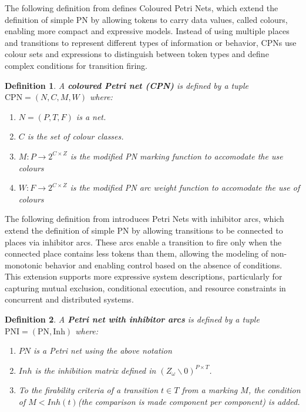 \documentclass[12pt]{article}
\newtheorem{definition}{Definition}
\begin{document}
    The following definition from \cite{girault2013petri} defines Coloured Petri Nets, which extend the definition of simple PN by allowing tokens to carry data values, called colours, enabling more compact and expressive models. Instead of using multiple places and transitions to represent different types of information or behavior, CPNs use colour sets and expressions to distinguish between token types and define complex conditions for transition firing. 
    \begin{definition}
        A \textbf{coloured Petri net (CPN)} is defined by a tuple \(\mathrm{CPN}=(N,C,M,W)\) where: 
        \begin{enumerate}
            \item $N=(P,T,F)$ is a net.
            \item \(C\) is the set of colour classes.
            \item \(M: P \rightarrow 2^{C \times Z}\) is the modified PN marking function to accomodate the use colours
            \item \(W: F \rightarrow 2^{C \times Z}\) is the modified PN arc weight function to accomodate the use of colours
        \end{enumerate}
    \end{definition}
    The following definition from \cite{diaz2013petri} introduces Petri Nets with inhibitor arcs, which extend the definition of simple PN by allowing transitions to be connected to places via inhibitor arcs. These arcs enable a transition to fire only when the connected place contains less tokens than them, allowing the modeling of non-monotonic behavior and enabling control based on the absence of conditions. This extension supports more expressive system descriptions, particularly for capturing mutual exclusion, conditional execution, and resource constraints in concurrent and distributed systems.
    \begin{definition}
        A \textbf{Petri net with inhibitor arcs} is defined by a tuple \(\mathrm{PNI}=(\mathrm{PN},\mathrm{Inh})\) where: 
        \begin{enumerate}
            \item \(PN\) is a Petri net using the above notation
            \item \(Inh\) is the inhibition matrix defined in \((Z_\omega \backslash 0)^{P\times T}\).
            \item To the firability criteria of a transition \(t \in T\) from a marking $M$, the condition of $M<Inh(t)$(the comparison is made component per component) is added.
        \end{enumerate}
    \end{definition}
\end{document}
